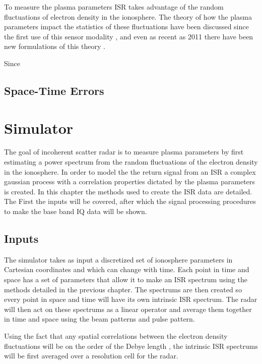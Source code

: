 \documentclass[draft,ras]{agutex}
\begin{document}
\begin{article}
To measure the plasma parameters ISR takes advantage of the random fluctuations of electron density in the ionosphere. The theory of how the plasma parameters impact the statistics of these fluctuations have been discussed since the first use of this sensor modality \citep{gordon58,dougherty:farley1960, farleydougherty:ISR2, doughteryfarley:ISR3, hagfors1961}, and even as recent as 2011 there have been new formulations of this theory \citep{kudeki:milla:1,kudeki:milla:2}. 

Since 
\subsection{Space-Time Errors}

\section{Simulator}

The goal of incoherent scatter radar is to measure plasma parameters by first estimating a power spectrum from the random fluctuations of the electron density in the ionosphere. In order to model the the return signal from an ISR a complex gaussian process with a correlation properties dictated by the plasma parameters is created. 
In this chapter the methods used to create the ISR data are detailed. The First the inputs will be covered, after which the signal processing procedures to make the base band IQ data will be shown.

\subsection{Inputs}
The simulator takes as input a discretized set of ionosphere parameters in Cartesian coordinates and which can change with time. Each point in time and space has a set of parameters that allow it to make an ISR spectrum using the methods detailed in the previous chapter. The spectrums are then created so every point in space and time will have its own intrinsic ISR spectrum. The radar will then act on these spectrums as a linear operator and average them together in time and space using the beam patterns and pulse pattern. 

Using the fact that any spatial correlations between the electron density fluctuations will be on the order of the Debye length \cite{farley1969}, the intrinsic ISR spectrums will be first averaged over a resolution cell for the radar. 


\end{article}
\end{document}
